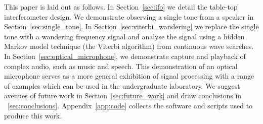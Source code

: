 \documentclass[paper-main.tex]{subfiles}
\begin{document}
This paper is laid out as follows. 
In Section~\ref{sec:ifo} we detail the table-top interferometer design. 
We demonstrate observing a single tone from a speaker in Section~\ref{sec:single_tone}. 
In Section~\ref{sec:viterbi_wandering} we replace the single tone with a wandering frequency signal and analyse the signal using a hidden Markov model technique (the Viterbi algorithm) from continuous wave searches. 
In Section~\ref{sec:optical_microphone}, we demonstrate capture and playback of complex audio, such as music and speech.
This demonstration of an optical microphone  serves as a more general exhibition of signal processing with a range of examples which can be used in the undergraduate laboratory. 
We suggest avenues of future work in Section~\ref{sec:future_work} and draw conclusions in ~\ref{sec:conclusions}. 
Appendix~\ref{app:code} collects the software and scripts used to produce this work.
\end{document}

